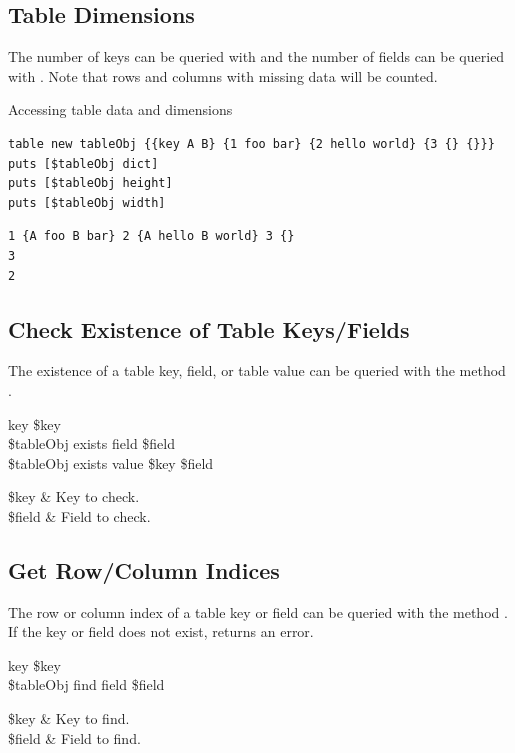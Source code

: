 \subsection{Table Dimensions}
The number of keys can be queried with  and the number of fields can be queried with . 
Note that rows and columns with missing data will be counted.
\begin{syntax}
\end{syntax}
\begin{syntax}
\end{syntax}

\begin{example}{Accessing table data and dimensions}
\begin{lstlisting}
table new tableObj {{key A B} {1 foo bar} {2 hello world} {3 {} {}}}
puts [$tableObj dict]
puts [$tableObj height]
puts [$tableObj width]
\end{lstlisting}
\tcblower
\begin{lstlisting}
1 {A foo B bar} 2 {A hello B world} 3 {}
3
2
\end{lstlisting}
\end{example}
\clearpage
\subsection{Check Existence of Table Keys/Fields}
The existence of a table key, field, or table value can be queried with the method . 
\begin{syntax}
 key \$key \\
\$tableObj exists field \$field \\
\$tableObj exists value \$key \$field
\end{syntax}
\begin{args}
\$key & Key to check. \\
\$field & Field to check.
\end{args}
\subsection{Get Row/Column Indices}
The row or column index of a table key or field can be queried with the method . 
If the key or field does not exist, returns an error.

\begin{syntax}
 key \$key \\
\$tableObj find field \$field
\end{syntax}
\begin{args}
\$key & Key to find. \\
\$field & Field to find.
\end{args}

